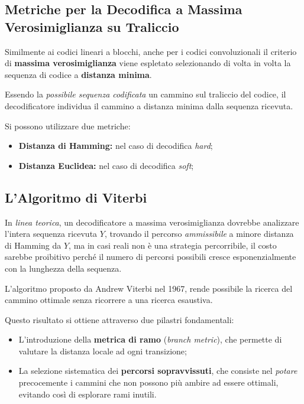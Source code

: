 \subsection{Metriche per la Decodifica a Massima Verosimiglianza su Traliccio}
Similmente ai codici lineari a blocchi, anche per i codici convoluzionali il criterio di \textbf{massima verosimiglianza} viene espletato selezionando di volta in volta la sequenza di codice a \textbf{distanza minima}.

Essendo la \textit{possibile sequenza codificata} un cammino sul traliccio del codice, il decodificatore individua il cammino a distanza minima dalla sequenza ricevuta.

Si possono utilizzare due metriche:
\begin{itemize}
    \item \textbf{Distanza di Hamming:} nel caso di decodifica \textit{hard};
    \item \textbf{Distanza Euclidea:} nel caso di decodifica \textit{soft};
\end{itemize}

\subsection{L'Algoritmo di Viterbi}
In \textit{linea teorica}, un decodificatore a massima verosimiglianza dovrebbe analizzare l'intera sequenza ricevuta $Y$, trovando il percorso \textit{ammissibile} a minore distanza di Hamming da $Y$, ma in casi reali non è una strategia percorribile, il costo sarebbe proibitivo perché il numero di percorsi possibili cresce esponenzialmente con la lunghezza della sequenza.

L'algoritmo proposto da Andrew Viterbi nel 1967, rende possibile la ricerca del cammino ottimale senza ricorrere a una ricerca esaustiva.

Questo risultato si ottiene attraverso due pilastri fondamentali:
\begin{itemize}
    \item L'introduzione della \textbf{metrica di ramo} (\textit{branch metric}), che permette di valutare la distanza locale ad ogni transizione;
    \item La selezione sistematica dei \textbf{percorsi sopravvissuti}, che consiste nel \textit{potare} precocemente i cammini che non possono più ambire ad essere ottimali, evitando così di esplorare rami inutili.
\end{itemize}



